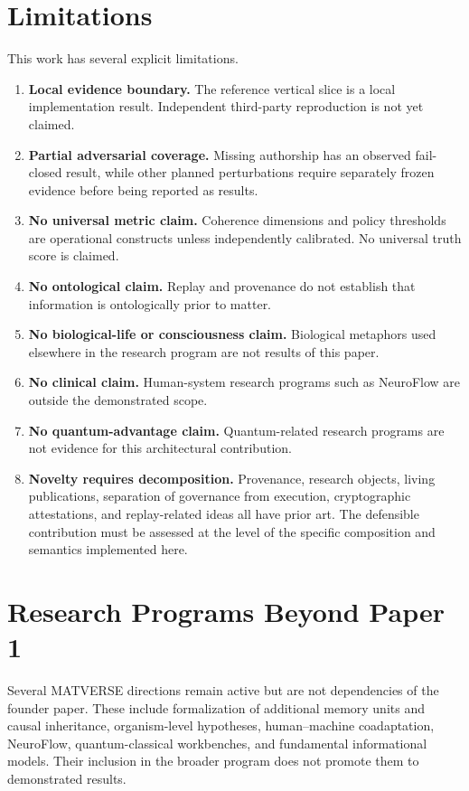 \documentclass[11pt]{article}
\begin{document}
\section{Limitations}

This work has several explicit limitations.

\begin{enumerate}
  \item \textbf{Local evidence boundary.} The reference vertical slice is a local implementation result. Independent third-party reproduction is not yet claimed.
  \item \textbf{Partial adversarial coverage.} Missing authorship has an observed fail-closed result, while other planned perturbations require separately frozen evidence before being reported as results.
  \item \textbf{No universal metric claim.} Coherence dimensions and policy thresholds are operational constructs unless independently calibrated. No universal truth score is claimed.
  \item \textbf{No ontological claim.} Replay and provenance do not establish that information is ontologically prior to matter.
  \item \textbf{No biological-life or consciousness claim.} Biological metaphors used elsewhere in the research program are not results of this paper.
  \item \textbf{No clinical claim.} Human-system research programs such as NeuroFlow are outside the demonstrated scope.
  \item \textbf{No quantum-advantage claim.} Quantum-related research programs are not evidence for this architectural contribution.
  \item \textbf{Novelty requires decomposition.} Provenance, research objects, living publications, separation of governance from execution, cryptographic attestations, and replay-related ideas all have prior art. The defensible contribution must be assessed at the level of the specific composition and semantics implemented here.
\end{enumerate}

\section{Research Programs Beyond Paper 1}

Several MATVERSE directions remain active but are not dependencies of the founder paper. These include formalization of additional memory units and causal inheritance, organism-level hypotheses, human--machine coadaptation, NeuroFlow, quantum-classical workbenches, and fundamental informational models. Their inclusion in the broader program does not promote them to demonstrated results.
\end{document}
